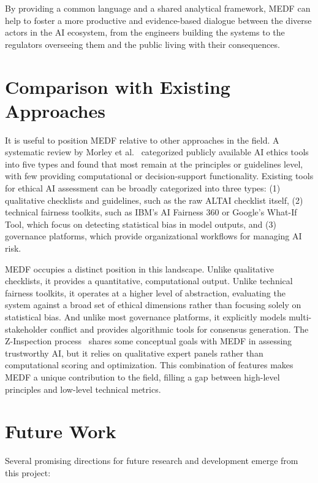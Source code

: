 By providing a common language and a shared analytical framework, MEDF can help to foster a more productive and evidence-based dialogue between the diverse actors in the AI ecosystem, from the engineers building the systems to the regulators overseeing them and the public living with their consequences.

\section{Comparison with Existing Approaches}
\label{sec:comparison}

It is useful to position MEDF relative to other approaches in the field. A systematic review by Morley et al.~\cite{morley2020what} categorized publicly available AI ethics tools into five types and found that most remain at the principles or guidelines level, with few providing computational or decision-support functionality. Existing tools for ethical AI assessment can be broadly categorized into three types: (1) qualitative checklists and guidelines, such as the raw ALTAI checklist itself, (2) technical fairness toolkits, such as IBM's AI Fairness 360 or Google's What-If Tool, which focus on detecting statistical bias in model outputs, and (3) governance platforms, which provide organizational workflows for managing AI risk.

MEDF occupies a distinct position in this landscape. Unlike qualitative checklists, it provides a quantitative, computational output. Unlike technical fairness toolkits, it operates at a higher level of abstraction, evaluating the system against a broad set of ethical dimensions rather than focusing solely on statistical bias. And unlike most governance platforms, it explicitly models multi-stakeholder conflict and provides algorithmic tools for consensus generation. The Z-Inspection process~\cite{zicari2021zinspection} shares some conceptual goals with MEDF in assessing trustworthy AI, but it relies on qualitative expert panels rather than computational scoring and optimization. This combination of features makes MEDF a unique contribution to the field, filling a gap between high-level principles and low-level technical metrics.

\section{Future Work}
\label{sec:future}

Several promising directions for future research and development emerge from this project:

